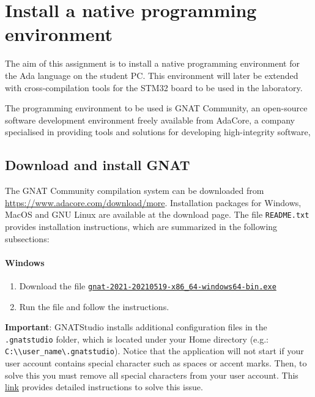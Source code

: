 \chapter{Install a native programming environment}\label{ch:Assignment1}

The aim of this assignment is to install a native programming environment for the Ada language on the student PC. This environment will later be extended with cross-compilation tools for the STM32 board to be used in the laboratory. 

The programming environment to be used is GNAT Community, an open-source software development environment freely available from AdaCore, a company specialised in providing tools and solutions for developing high-integrity software,

\section{Download and install GNAT}
The GNAT Community compilation system can be downloaded from \url{https://www.adacore.com/download/more}.
Installation packages for Windows, MacOS and GNU Linux
are available at the download page.
The file \texttt{README.txt} provides installation instructions,
which are summarized in the following subsections:

\subsubsection*{Windows}
\begin{enumerate}
	\item Download the file \href{https://community.download.adacore.com/v1/797dbae8bdb8a3f661dad78dd73d8e40218a68d8?filename=gnat-2021-20210519-x86\_64-windows64-bin.exe\&rand=1472}{\texttt{gnat-2021-20210519-x86\_64-windows64-bin.exe}}
	
	\item Run the file and follow the instructions.
\end{enumerate}

\textbf{\textcolor{mRedBrown}{Important}}:
GNATStudio installs additional configuration files in the \texttt{.gnatstudio} folder,
which is located under your Home directory (e.g.: \texttt{C:\textbackslash{}\textbackslash{}user\_name\textbackslash{}.gnatstudio}).
Notice that the application will not start if your user account contains special character such as spaces or accent marks.
Then, to solve this you must remove all special characters from your user account.
This 
\href{https://superuser.com/questions/890812/how-to-rename-the-user-folder-in-windows-10/1346983#1346983}
{link}
provides detailed instructions to solve this issue.


